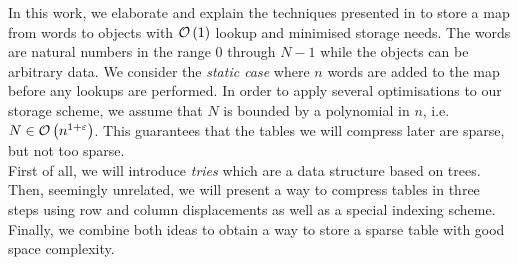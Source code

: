 In this work, we elaborate and explain the techniques presented in \cite{tarjan:storing_sparse_table} to store a map from words to objects with $\mathcal{O}\left(1\right)$ lookup and minimised storage needs.
The words are natural numbers in the range $0$ through $N-1$ while the objects can be arbitrary data.
We consider the \emph{static case} where $n$ words are added to the map before any lookups are performed.
In order to apply several optimisations to our storage scheme, we assume that $N$ is bounded by a polynomial in $n$, i.e.~$N \in \mathcal{O}\left(n^{1 + \varepsilon}\right)$.
This guarantees that the tables we will compress later are sparse, but not too sparse. \\
First of all, we will introduce \emph{tries} which are a data structure based on trees.
Then, seemingly unrelated, we will present a way to compress tables in three steps using row and column displacements as well as a special indexing scheme.
Finally, we combine both ideas to obtain a way to store a sparse table with good space complexity.